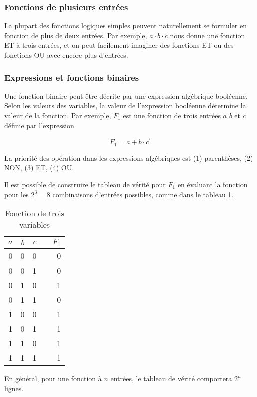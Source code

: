 \documentclass[11pt]{article}
\begin{document}
\subsubsection{Fonctions de plusieurs entrées}
\label{sec:org76672aa}

La plupart des fonctions logiques simples peuvent naturellement se
formuler en fonction de plus de deux entrées. Par exemple, \(a \cdot b
\cdot c\) nous donne une fonction ET à trois entrées, et on peut
facilement imaginer des fonctions ET ou des fonctions OU avec encore
plus d'entrées.

\subsubsection{Expressions et fonctions binaires}
\label{sec:org99f4145}

Une fonction binaire peut être décrite par une expression algébrique
booléenne. Selon les valeurs des variables, la valeur de l'expression
booléenne détermine la valeur de la fonction. Par exemple, \(F_1\) est
une fonction de trois entrées \(a\) \(b\) et \(c\) définie par
l'expression

$$ F_1 = a + b \cdot c^\prime $$

La priorité des opération dans les expressions algébriques est (1)
parenthèses, (2) NON, (3) ET, (4) OU.

Il est possible de construire le tableau de vérité pour \(F_1\) en
évaluant la fonction pour les \(2^3 = 8\) combinaisons d'entrées
possibles, comme dans le tableau \ref{tab:org90a3db9}.

\begin{table}[htbp]
\caption{\label{tab:org90a3db9}Fonction de trois variables}
\centering
\begin{tabular}{rrrlr}
\(a\) & \(b\) & \(c\) &  & \(F_1\)\\[0pt]
\hline
0 & 0 & 0 &  & 0\\[0pt]
0 & 0 & 1 &  & 0\\[0pt]
0 & 1 & 0 &  & 1\\[0pt]
0 & 1 & 1 &  & 0\\[0pt]
1 & 0 & 0 &  & 1\\[0pt]
1 & 0 & 1 &  & 1\\[0pt]
1 & 1 & 0 &  & 1\\[0pt]
1 & 1 & 1 &  & 1\\[0pt]
\end{tabular}
\end{table}

En général, pour une fonction à \(n\) entrées, le tableau de vérité
comportera \(2^n\) lignes.
\end{document}

